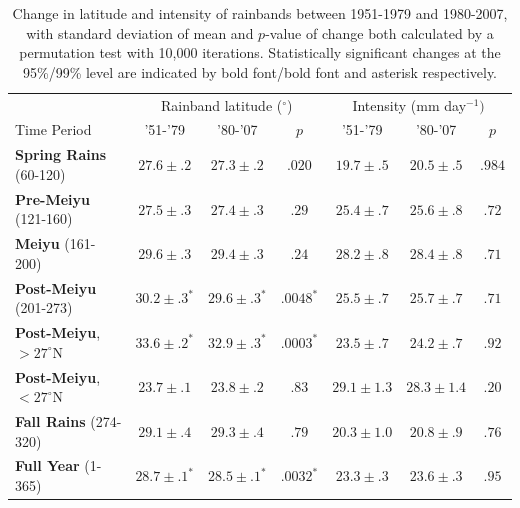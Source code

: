 \documentclass{ametsoc}
\begin{document}
\begin{table}

\centering

\caption{Change in latitude and intensity of rainbands between 1951-1979 and 1980-2007, with standard deviation of mean and $p$-value of change both calculated by a permutation test with 10,000 iterations. Statistically significant changes at the 95\%/99\% level are indicated by bold font/bold font and asterisk respectively.}

\begin{tabular}{ l c c c c c c}
	& \multicolumn{3}{c}{Rainband latitude ($^\circ$)} & \multicolumn{3}{c}{Intensity (mm day$^{-1})$} \\
	Time Period & '51-'79 & '80-'07 & $p$ & '51-'79 & '80-'07 & $p$ \\
	\hline	
	\textbf{Spring Rains} (60-120)		& $\boldsymbol{27.6 \pm .2}$ & $\boldsymbol{27.3 \pm .2}$ & $ \boldsymbol{.020} $ 		& $\boldsymbol{19.7 \pm .5}$ 	& $\boldsymbol{20.5 \pm .5} $ & $\boldsymbol{.984}$ \\
	\textbf{Pre-Meiyu} (121-160) 		& $27.5 \pm .3$ & $27.4 \pm .3$ & $ .29 $ 		& $25.4 \pm .7$ 	& $25.6 \pm .8	$ & $.72$ \\
	\textbf{Meiyu} (161-200)			& $29.6 \pm .3$ & $29.4 \pm .3$ & $ .24 $ 		& $28.2 \pm .8$ 	& $28.4 \pm .8	$  & $.71$ \\
	\textbf{Post-Meiyu} (201-273)		& $\boldsymbol{30.2 \pm .3^*}$ & $\boldsymbol{29.6 \pm .3^*}$ & $\boldsymbol{.0048^*} $	& $25.5 \pm .7$ 	& $25.7 \pm .7	$ & $.71$ \\
	\textbf{Post-Meiyu}, $>27^\circ$N 	& $\boldsymbol{33.6 \pm .2^*}$ & $\boldsymbol{32.9 \pm .3^*}$ & $\boldsymbol{.0003^*} $ 	& $23.5 \pm .7$ 	& $24.2 \pm .7	$ & $.92$ \\
	\textbf{Post-Meiyu}, $<27^\circ$N 	& $23.7 \pm .1 $ & $23.8 \pm .2$ & $ .83 $ 	& $29.1 \pm 1.3$ 	& $28.3 \pm 1.4	$ & $.20$  \\
	\textbf{Fall Rains} (274-320)			& $29.1 \pm .4 $ & $29.3 \pm .4$ & $ .79 $ 	& $20.3 \pm 1.0$ 	& $20.8 \pm .9	$ & $.76$ \\
	\textbf{Full Year} (1-365)			& $\boldsymbol{28.7 \pm .1^*}$ & $\boldsymbol{28.5 \pm .1^*}$ & $\boldsymbol{.0032^*}$ 	& $23.3 \pm .3$ 	& $23.6 \pm .3	$ & $.95$ \\

\end{tabular}
\label{tab:t36}
\end{table}
\end{document}

